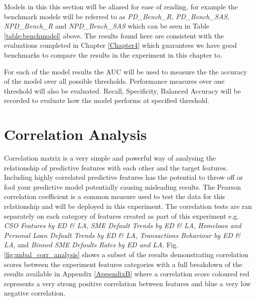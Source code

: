 Models in this this section will be aliased for ease of reading, for example the benchmark models will be referred to as \textit{PD\_Bench\_R}, \textit{PD\_Bench\_SAS}, \textit{NPD\_Bench\_R} and \textit{NPD\_Bench\_SAS} which can be seen in Table \ref{table:benchmodel} above. The results found here are consistent with the evaluations completed in Chapter \ref{Chapter4} which guarantees we have good benchmarks to compare the results in the experiment in this chapter to.


For each of the model results the AUC will be used to measure the the accuracy of the model over all possible thresholds. Performance measures over one threshold will also be evaluated. Recall, Specificity, Balanced Accuracy will be recorded to evaluate how the model performs at specified threshold.


\section{Correlation Analysis}
Correlation matrix is a very simple and powerful way of analysing the relationship of predictive features with each other and the target features. Including highly correlated predictive features has the potential to throw off or fool your predictive model potentially causing misleading results. The Pearson correlation coefficient is a common measure used to test the data for this relationship and will be deployed in this experiment. The correlation tests are ran separately on each category of features created as part of this experiment e.g. \textit{CSO Features by ED \& LA}, \textit{SME Default Trends by ED \& LA}, \textit{Homeloan and Personal Loan Default Trends by ED \& LA}, \textit{Transactions Behaviour by ED \& LA}, and \textit{Binned SME Defaults Rates by ED and LA}. Fig. \ref{fig:unbal_corr_analysis} shows a subset of the results demonstrating correlation scores between the experiment features categories with a full breakdown of the results available in Appendix \ref{AppendixB} where a correlation score coloured red represents a very strong positive correlation between features and blue a very low negative correlation.

